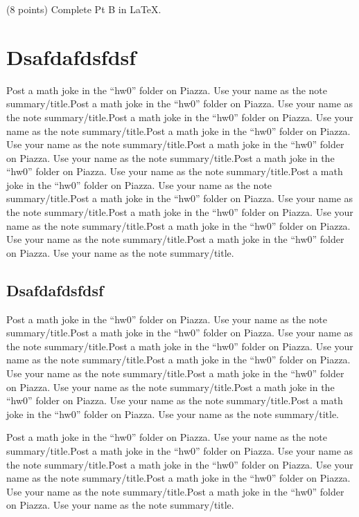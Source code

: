 \noindent (8 points) Complete Pt B in \LaTeX.





\newpage



\section{Dsafdafdsfdsf}

Post a math joke in the ``hw0'' folder on Piazza.
Use your name as the note summary/title.Post a math joke in the ``hw0'' folder on Piazza.
Use your name as the note summary/title.Post a math joke in the ``hw0'' folder on Piazza.
Use your name as the note summary/title.Post a math joke in the ``hw0'' folder on Piazza.
Use your name as the note summary/title.Post a math joke in the ``hw0'' folder on Piazza.
Use your name as the note summary/title.Post a math joke in the ``hw0'' folder on Piazza.
Use your name as the note summary/title.Post a math joke in the ``hw0'' folder on Piazza.
Use your name as the note summary/title.Post a math joke in the ``hw0'' folder on Piazza.
Use your name as the note summary/title.Post a math joke in the ``hw0'' folder on Piazza.
Use your name as the note summary/title.Post a math joke in the ``hw0'' folder on Piazza.
Use your name as the note summary/title.Post a math joke in the ``hw0'' folder on Piazza.
Use your name as the note summary/title.


\subsection{Dsafdafdsfdsf}
Post a math joke in the ``hw0'' folder on Piazza.
Use your name as the note summary/title.Post a math joke in the ``hw0'' folder on Piazza.
Use your name as the note summary/title.Post a math joke in the ``hw0'' folder on Piazza.
Use your name as the note summary/title.Post a math joke in the ``hw0'' folder on Piazza.
Use your name as the note summary/title.Post a math joke in the ``hw0'' folder on Piazza.
Use your name as the note summary/title.Post a math joke in the ``hw0'' folder on Piazza.
Use your name as the note summary/title.Post a math joke in the ``hw0'' folder on Piazza.
Use your name as the note summary/title.

Post a math joke in the ``hw0'' folder on Piazza.
Use your name as the note summary/title.Post a math joke in the ``hw0'' folder on Piazza.
Use your name as the note summary/title.Post a math joke in the ``hw0'' folder on Piazza.
Use your name as the note summary/title.Post a math joke in the ``hw0'' folder on Piazza.
Use your name as the note summary/title.Post a math joke in the ``hw0'' folder on Piazza.
Use your name as the note summary/title.